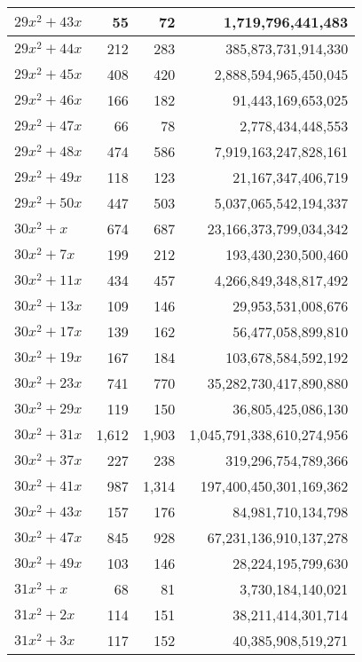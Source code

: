 \documentclass[a4paper]{amsproc}
\theoremstyle{plain}
\begin{document}
\begin{longtable}{ | l | r | r | r | }
$29x^2 + 43x$ & 55 & 72 & 1{,}719{,}796{,}441{,}483 \\ \hline
$29x^2 + 44x$ & 212 & 283 & 385{,}873{,}731{,}914{,}330 \\ \hline
$29x^2 + 45x$ & 408 & 420 & 2{,}888{,}594{,}965{,}450{,}045 \\ \hline
$29x^2 + 46x$ & 166 & 182 & 91{,}443{,}169{,}653{,}025 \\ \hline
$29x^2 + 47x$ & 66 & 78 & 2{,}778{,}434{,}448{,}553 \\ \hline
$29x^2 + 48x$ & 474 & 586 & 7{,}919{,}163{,}247{,}828{,}161 \\ \hline
$29x^2 + 49x$ & 118 & 123 & 21{,}167{,}347{,}406{,}719 \\ \hline
$29x^2 + 50x$ & 447 & 503 & 5{,}037{,}065{,}542{,}194{,}337 \\ \hline
$30x^2 + x$ & 674 & 687 & 23{,}166{,}373{,}799{,}034{,}342 \\ \hline
$30x^2 + 7x$ & 199 & 212 & 193{,}430{,}230{,}500{,}460 \\ \hline
$30x^2 + 11x$ & 434 & 457 & 4{,}266{,}849{,}348{,}817{,}492 \\ \hline
$30x^2 + 13x$ & 109 & 146 & 29{,}953{,}531{,}008{,}676 \\ \hline
$30x^2 + 17x$ & 139 & 162 & 56{,}477{,}058{,}899{,}810 \\ \hline
$30x^2 + 19x$ & 167 & 184 & 103{,}678{,}584{,}592{,}192 \\ \hline
$30x^2 + 23x$ & 741 & 770 & 35{,}282{,}730{,}417{,}890{,}880 \\ \hline
$30x^2 + 29x$ & 119 & 150 & 36{,}805{,}425{,}086{,}130 \\ \hline
$30x^2 + 31x$ & 1{,}612 & 1{,}903 & 1{,}045{,}791{,}338{,}610{,}274{,}956 \\ \hline
$30x^2 + 37x$ & 227 & 238 & 319{,}296{,}754{,}789{,}366 \\ \hline
$30x^2 + 41x$ & 987 & 1{,}314 & 197{,}400{,}450{,}301{,}169{,}362 \\ \hline
$30x^2 + 43x$ & 157 & 176 & 84{,}981{,}710{,}134{,}798 \\ \hline
$30x^2 + 47x$ & 845 & 928 & 67{,}231{,}136{,}910{,}137{,}278 \\ \hline
$30x^2 + 49x$ & 103 & 146 & 28{,}224{,}195{,}799{,}630 \\ \hline
$31x^2 + x$ & 68 & 81 & 3{,}730{,}184{,}140{,}021 \\ \hline
$31x^2 + 2x$ & 114 & 151 & 38{,}211{,}414{,}301{,}714 \\ \hline
$31x^2 + 3x$ & 117 & 152 & 40{,}385{,}908{,}519{,}271 \\ \hline

\end{longtable}
\end{document}
